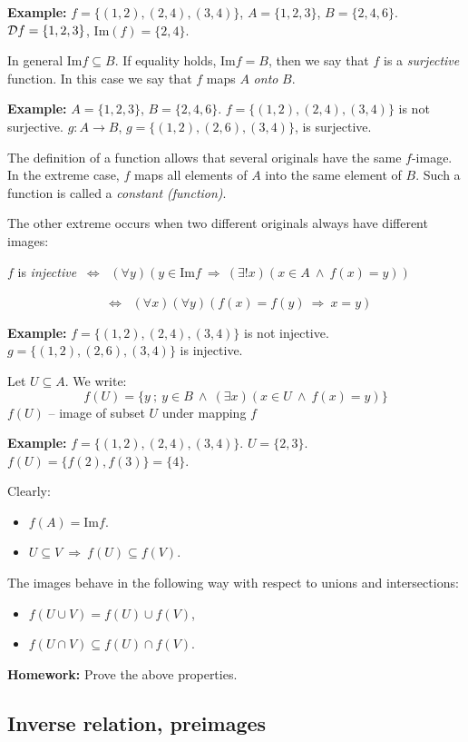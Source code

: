 \documentclass[11pt,paper=b5,footinclude,headinclude]{scrbook} %
\def\inn {{~\wedge~}}
\def\sledi {{~\Rightarrow~}}
\def\cee {{~\Leftrightarrow~}}
\theoremstyle{remark}
\theoremstyle{definition} %
\theoremstyle{theorem} %
\begin{document}
\medskip
\textbf{ Example:} $f = \{(1,2),(2,4),(3,4)\}$, $A = \{1,2,3\}$, $B = \{2,4,6\}$.
${\cal D}f = \{1,2,3\}$, $\textrm{Im}(f) = \{2,4\}$.

\bigskip
In general $\textrm{Im}f \subseteq B$. If equality holds, $\textrm{Im}f  = B$, then we say that $f$ is a {\em surjective} function.
In this case we say that $f$ maps $A$ {\em onto} $B$.

\bigskip
\textbf{ Example:} $A = \{1,2,3\}$, $B = \{2,4,6\}$. $f= \{(1,2),(2,4),(3,4)\}$ is not surjective. $g:A\to B$, $g = \{(1,2),(2,6),(3,4)\}$, is surjective.

\bigskip
The definition of a function allows that several originals have the same $f$-image.
In the extreme case, $f$ maps all elements of $A$ into the same element of $B$.
Such a function is called a {\em constant (function)}.

The other extreme occurs when two different originals always have different images:

$f$ is {\em injective} $\cee$ $(\forall y)(y\in \textrm{Im}f\sledi (\exists!x)(x\in A \inn f(x) = y))$

~~~~~~~~~~~~~~~$\cee$ $(\forall x)(\forall y)(f(x) = f(y) \sledi x = y)$

\bigskip
\textbf{ Example:} $f = \{(1,2),(2,4),(3,4)\}$ is not injective.
$g = \{(1,2),(2,6),(3,4)\}$ is injective.

\bigskip
Let $U\subseteq A$. We write:
$$f(U) = \{y~;~y\in B\inn (\exists x)(x\in U\inn f(x) = y)\}$$
$f(U)$ -- image of subset  $U$ under mapping $f$

\bigskip
\textbf{ Example:} $f = \{(1,2),(2,4),(3,4)\}$.
$U = \{2,3\}$. $f(U) = \{f(2),f(3)\} = \{4\}$.

\medskip
Clearly:
\begin{itemize}
  \item $f(A) = \textrm{Im}f$.
  \item $U\subseteq V\sledi f(U)\subseteq f(V)$.
\end{itemize}

The images behave in the following way with respect to unions and intersections:
\begin{itemize}
  \item $f(U\cup V) = f(U)\cup f(V)$,
  \item $f(U\cap V) \subseteq f(U)\cap f(V)$.
\end{itemize}

\textbf{ Homework:} Prove the above properties.

\subsection{Inverse relation, preimages}
\end{document}
